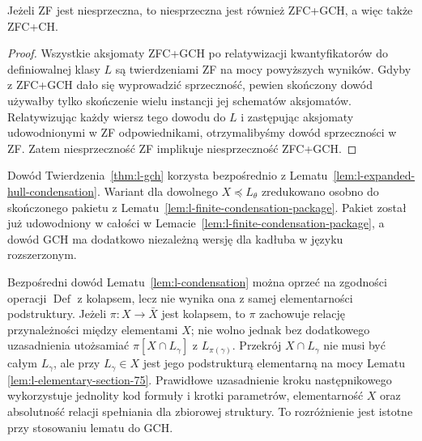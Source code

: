 \begin{wniosek}
\label{cor:l-relative-consistency}
Jeżeli ZF jest niesprzeczna, to niesprzeczna jest
również ZFC+GCH, a więc także ZFC+CH.
\end{wniosek}
\begin{proof}
Wszystkie aksjomaty ZFC+GCH po relatywizacji
kwantyfikatorów do definiowalnej klasy $L$
są twierdzeniami ZF na mocy powyższych wyników.
Gdyby z ZFC+GCH dało się wyprowadzić sprzeczność,
pewien skończony dowód używałby tylko skończenie
wielu instancji jej schematów aksjomatów.
Relatywizując każdy wiersz tego dowodu do $L$
i zastępując aksjomaty udowodnionymi w ZF
odpowiednikami, otrzymalibyśmy dowód sprzeczności
w ZF. Zatem niesprzeczność ZF implikuje
niesprzeczność ZFC+GCH.
\end{proof}


\begin{uwaga}
\label{rem:ch-gch-independent-of-full-condensation}
Dowód Twierdzenia~\ref{thm:l-gch} korzysta bezpośrednio
z Lematu~\ref{lem:l-expanded-hull-condensation}.
Wariant dla dowolnego $X\preccurlyeq L_\theta$
zredukowano osobno do skończonego pakietu
z Lematu~\ref{lem:l-finite-condensation-package}.
Pakiet został już udowodniony w całości w
Lemacie~\ref{lem:l-finite-condensation-package},
a dowód GCH ma dodatkowo niezależną wersję dla
kadłuba w języku rozszerzonym.
\end{uwaga}

\begin{uwaga}
\label{rem:l-condensation-proof-scope}
Bezpośredni dowód Lematu~\ref{lem:l-condensation} można oprzeć
na zgodności operacji $\operatorname{Def}$ z kolapsem, lecz
nie wynika ona z samej elementarności podstruktury. Jeżeli $\pi:X\to\bar X$ jest kolapsem, to
$\pi$ zachowuje relację przynależności między elementami $X$;
nie wolno jednak bez dodatkowego uzasadnienia utożsamiać
$\pi[X\cap L_\gamma]$ z $L_{\pi(\gamma)}$.
Przekrój $X\cap L_\gamma$ nie musi być całym $L_\gamma$,
ale przy $L_\gamma\in X$ jest jego podstrukturą elementarną
na mocy Lematu~
\ref{lem:l-elementary-section-75}.
Prawidłowe uzasadnienie kroku następnikowego wykorzystuje
jednolity kod formuły i krotki parametrów, elementarność
$X$ oraz absolutność relacji spełniania dla zbiorowej struktury.
To rozróżnienie jest istotne przy stosowaniu lematu do GCH.
\end{uwaga}



